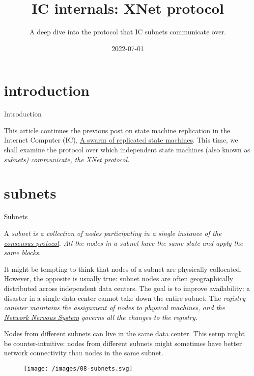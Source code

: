 \documentclass{article}
\title{IC internals: XNet protocol}
\subtitle{A deep dive into the protocol that IC subnets communicate over.}
\date{2022-07-01}
\begin{document}
\section{introduction}{Introduction}

This article continues the previous post on state machine replication in the Internet Computer (IC), \href{/posts/02-ic-state-machine-replication.html}{A swarm of replicated state machines}.
This time, we shall examine the protocol over which independent state machines (also known as \em{subnets}) communicate, the \em{XNet protocol}. 

\section{subnets}{Subnets}

A \em{subnet} is a collection of nodes participating in a single instance of the \href{https://dfinity.org/howitworks/consensus}{consensus protocol}.
All the nodes in a subnet have the same state and apply the same blocks.

It might be tempting to think that nodes of a subnet are physically collocated.
However, the opposite is usually true: subnet nodes are often geographically distributed across independent data centers.
The goal is to improve availability: a disaster in a single data center cannot take down the entire subnet.
The \em{registry} canister maintains the assignment of nodes to physical machines, and the \href{https://dfinity.org/howitworks/network-nervous-system-nns}{Network Nervous System} governs all the changes to the registry.

Nodes from different subnets can live in the same data center.
This setup might be counter-intuitive: nodes from different subnets might sometimes have better network connectivity than nodes in the same subnet.

\begin{figure}[grayscale-diagram]
  \texttt{[image: /images/08-subnets.svg]}
\end{figure}
\end{document}
